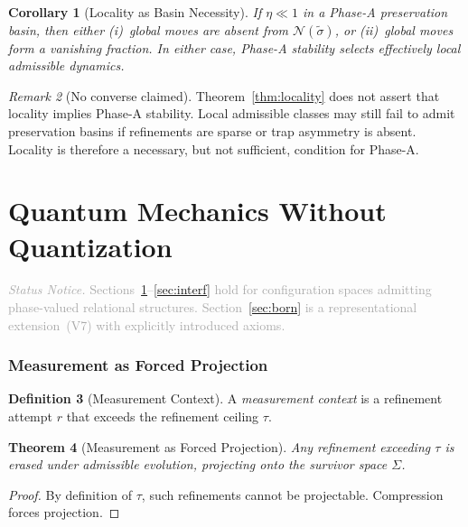\documentclass[11pt,a4paper]{article}
\newtheorem{theorem}{Theorem}[section]
\newtheorem{corollary}[theorem]{Corollary}
\theoremstyle{definition}
\newtheorem{definition}[theorem]{Definition}
\theoremstyle{remark}
\newtheorem{remark}[theorem]{Remark}
\newcommand{\statusnotice}[1]{%
  \medskip\noindent\textcolor{darkgray}{\textit{Status Notice.} #1}\medskip
}
\begin{document}
\begin{corollary}[Locality as Basin Necessity]\label{cor:locality}
If $\eta \ll 1$ in a Phase-A preservation basin, then either (i)~global moves are absent from $\mathcal{N}(\tilde{\sigma})$, or (ii)~global moves form a vanishing fraction. In either case, Phase-A stability selects effectively local admissible dynamics.
\end{corollary}

\begin{remark}[No converse claimed]
Theorem~\ref{thm:locality} does not assert that locality implies Phase-A stability. Local admissible classes may still fail to admit preservation basins if refinements are sparse or trap asymmetry is absent. Locality is therefore a necessary, but not sufficient, condition for Phase-A.
\end{remark}


\part{Quantum Mechanics Without Quantization}

\statusnotice{Sections~\ref{sec:meas}--\ref{sec:interf} hold for configuration spaces admitting phase-valued relational structures. Section~\ref{sec:born} is a representational extension~(V7) with explicitly introduced axioms.}

\section{Measurement as Forced Projection}\label{sec:meas}

\begin{definition}[Measurement Context]\label{def:meas}
A \emph{measurement context} is a refinement attempt $r$ that exceeds the refinement ceiling $\tau$.
\end{definition}

\begin{theorem}[Measurement as Forced Projection]\label{thm:meas}
Any refinement exceeding $\tau$ is erased under admissible evolution, projecting onto the survivor space $\Sigma$.
\end{theorem}
\begin{proof}
By definition of $\tau$, such refinements cannot be projectable. Compression forces projection.
\end{proof}
\end{document}
